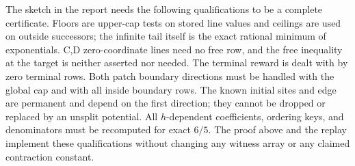 The sketch in the report needs the following qualifications
to be a complete certificate.  Floors are upper-cap tests
on stored line values and ceilings are used on outside
successors; the infinite tail itself is the exact rational
minimum of exponentials.  C,D zero-coordinate lines need
no free row, and the free inequality at the target is neither
asserted nor needed.  The terminal reward is dealt with by
zero terminal rows.  Both patch boundary directions must be
handled with the global cap and with all inside boundary
rows.  The known initial sites and edge are permanent and
depend on the first direction; they cannot be dropped or
replaced by an unsplit potential.  All $h$-dependent
coefficients, ordering keys, and denominators must be
recomputed for exact $6/5$.  The proof above and the replay
implement these qualifications without changing any witness
array or any claimed contraction constant.

